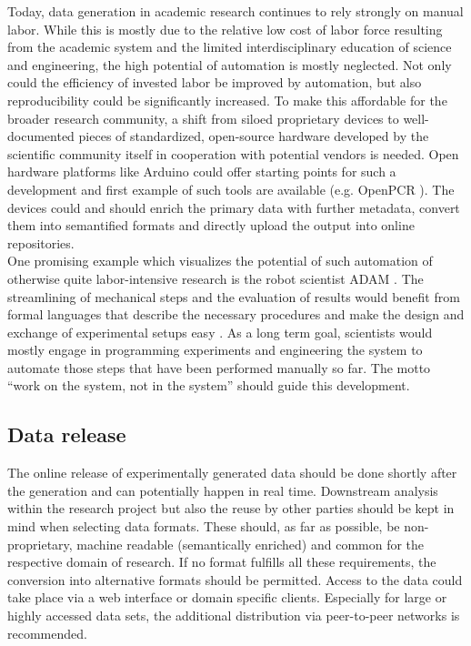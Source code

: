 \documentclass{article}
\begin{document}
Today, data generation in academic research continues to rely strongly
on manual labor. While this is mostly due to the relative low cost of
labor force resulting from the academic system and the limited
interdisciplinary education of science and engineering, the high
potential of automation is mostly neglected. Not only could the
efficiency of invested labor be improved by automation, but also
reproducibility could be significantly increased. To make this
affordable for the broader research community, a shift from siloed
proprietary devices to well-documented pieces of standardized,
open-source hardware developed by the scientific community itself in
cooperation with potential vendors is needed. Open hardware platforms
like Arduino \cite{Arduino} could offer starting points for such a
development and first example of such tools are available
(e.g. OpenPCR \cite{OpenPCR}). The devices could and should enrich the
primary data with further metadata, convert them into semantified
formats and directly upload the output into online repositories.\\

One promising example which visualizes the potential of such
automation of otherwise quite labor-intensive research is the robot
scientist ADAM \cite{Ross}. The streamlining of mechanical steps and
the evaluation of results would benefit from formal languages that
describe the necessary procedures and make the design and exchange of
experimental setups easy \cite{Soldatova}. As a long term goal,
scientists would mostly engage in programming experiments and
engineering the system to automate those steps that have been
performed manually so far. The motto ``work on the system, not in the
system'' should guide this development.

\subsection{Data release}

The online release of experimentally generated data should be done
shortly after the generation and can potentially happen in real
time. Downstream analysis within the research project but also the
reuse by other parties should be kept in mind when selecting data
formats. These should, as far as possible, be non-proprietary, machine
readable (semantically enriched) and common for the respective domain
of research. If no format fulfills all these requirements, the
conversion into alternative formats should be permitted. Access to the
data could take place via a web interface or domain specific
clients. Especially for large or highly accessed data sets, the
additional distribution via peer-to-peer networks is recommended.
\end{document}
